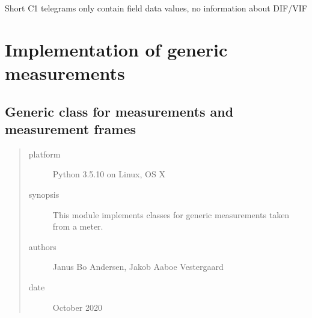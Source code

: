 \documentclass[letterpaper,10pt,english]{sphinxmanual}
\begin{document}
\begin{fulllineitems}
\begin{fulllineitems}
\end{fulllineitems}


\begin{fulllineitems}
\label{\detokenize{omnipower:OmniPower.OmniPower.OmniPower.unpack_short_telegram_data}}
Short C1 telegrams only contain field data values, no information about DIF/VIF

\end{fulllineitems}


\end{fulllineitems}



\chapter{Implementation of generic measurements}
\label{\detokenize{metermeasurement:module-OmniPower.MeterMeasurement}}\label{\detokenize{metermeasurement:implementation-of-generic-measurements}}\label{\detokenize{metermeasurement::doc}}

\section{Generic class for measurements and measurement frames}
\label{\detokenize{metermeasurement:generic-class-for-measurements-and-measurement-frames}}\begin{quote}\begin{description}
\item[{platform}] \leavevmode
Python 3.5.10 on Linux, OS X

\item[{synopsis}] \leavevmode
This module implements classes for generic measurements taken from a meter.

\item[{authors}] \leavevmode
Janus Bo Andersen, Jakob Aaboe Vestergaard

\item[{date}]  October 2020

\end{description}\end{quote}
\end{document}
